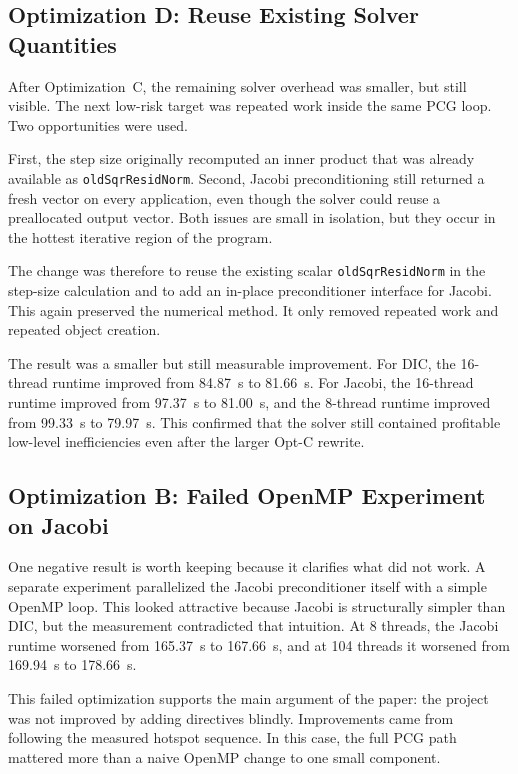 \documentclass[10pt,firstlineindent,nopartpage,article,accentcolor=tud1b]{tudreport}
\begin{document}
\subsection{Optimization D: Reuse Existing Solver Quantities}
After Optimization~C, the remaining solver overhead was smaller, but still
visible. The next low-risk target was repeated work inside the same PCG loop.
Two opportunities were used.

First, the step size originally recomputed an inner product that was already
available as \texttt{oldSqrResidNorm}. Second, Jacobi preconditioning still
returned a fresh vector on every application, even though the solver could
reuse a preallocated output vector. Both issues are small in isolation, but
they occur in the hottest iterative region of the program.

The change was therefore to reuse the existing scalar
\texttt{oldSqrResidNorm} in the step-size calculation and to add an in-place
preconditioner interface for Jacobi. This again preserved the numerical method.
It only removed repeated work and repeated object creation.

The result was a smaller but still measurable improvement. For DIC, the
16-thread runtime improved from \SI{84.87}{s} to \SI{81.66}{s}. For Jacobi, the
16-thread runtime improved from \SI{97.37}{s} to \SI{81.00}{s}, and the
8-thread runtime improved from \SI{99.33}{s} to \SI{79.97}{s}. This confirmed
that the solver still contained profitable low-level inefficiencies even after
the larger Opt-C rewrite.

\subsection{Optimization B: Failed OpenMP Experiment on Jacobi}
One negative result is worth keeping because it clarifies what did not work. A
separate experiment parallelized the Jacobi preconditioner itself with a simple
OpenMP loop. This looked attractive because Jacobi is structurally simpler than
DIC, but the measurement contradicted that intuition. At 8 threads, the Jacobi
runtime worsened from \SI{165.37}{s} to \SI{167.66}{s}, and at 104 threads it
worsened from \SI{169.94}{s} to \SI{178.66}{s}.

This failed optimization supports the main argument of the paper: the project
was not improved by adding directives blindly. Improvements came from following
the measured hotspot sequence. In this case, the full PCG path mattered more
than a naive OpenMP change to one small component.
\end{document}
